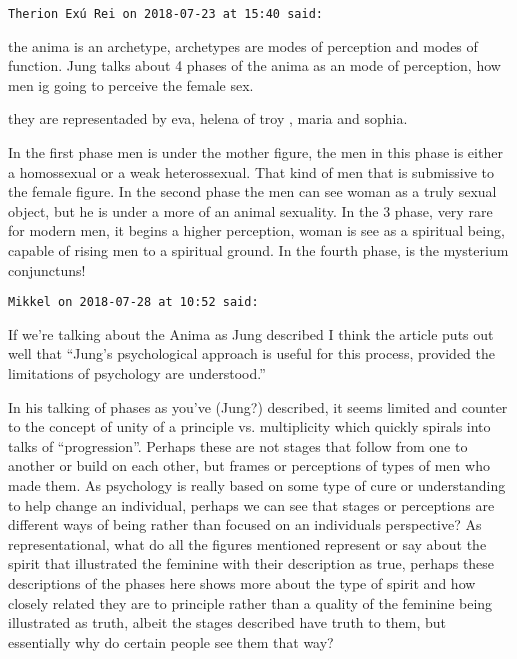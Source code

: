 \begin{footnotesize}\begin{sffamily}



\texttt{Therion Exú Rei on 2018-07-23 at 15:40 said: }

the anima is an archetype, archetypes are modes of perception and modes of function. Jung talks about 4 phases of the anima as an mode of perception, how men ig going to perceive the female sex.

they are representaded by eva, helena of troy , maria and sophia.

In the first phase men is under the mother figure, the men in this phase is either a homossexual or a weak heterossexual. That kind of men that is submissive to the female figure. In the second phase the men can see woman as a truly sexual object, but he is under a more of an animal sexuality. In the 3 phase, very rare for modern men, it begins a higher perception, woman is see as a spiritual being, capable of rising men to a spiritual ground. In the fourth phase, is the mysterium conjunctuns!


\hfill

\texttt{Mikkel on 2018-07-28 at 10:52 said: }

If we're talking about the Anima as Jung described I think the article puts out well that “Jung's psychological approach is useful for this process, provided the limitations of psychology are understood.” 

In his talking of phases as you've (Jung?) described, it seems limited and counter to the concept of unity of a principle vs. multiplicity which quickly spirals into talks of “progression”. Perhaps these are not stages that follow from one to another or build on each other, but frames or perceptions of types of men who made them. As psychology is really based on some type of cure or understanding to help change an individual, perhaps we can see that stages or perceptions are different ways of being rather than focused on an individuals perspective? As representational, what do all the figures mentioned represent or say about the spirit that illustrated the feminine with their description as true, perhaps these descriptions of the phases here shows more about the type of spirit and how closely related they are to principle rather than a quality of the feminine being illustrated as truth, albeit the stages described have truth to them, but essentially why do certain people see them that way?



\end{sffamily}
\end{footnotesize}
